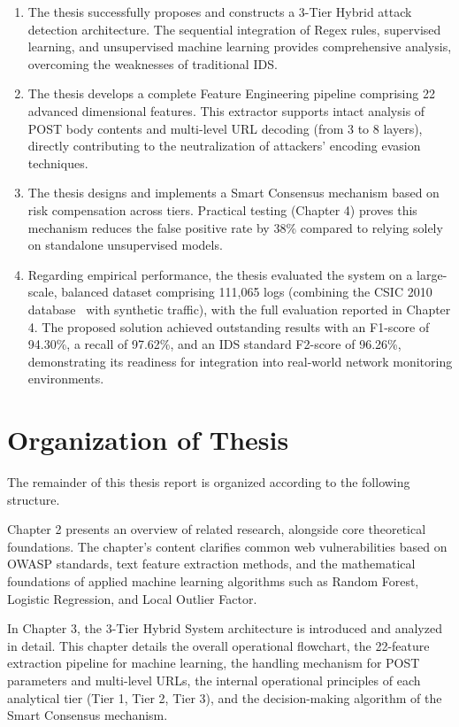 \documentclass[../main.tex]{subfiles}
\begin{document}
\begin{enumerate}
\item The thesis successfully proposes and constructs a 3-Tier Hybrid attack detection architecture. The sequential integration of Regex rules, supervised learning, and unsupervised machine learning provides comprehensive analysis, overcoming the weaknesses of traditional IDS.
\item The thesis develops a complete Feature Engineering pipeline comprising 22 advanced dimensional features. This extractor supports intact analysis of POST body contents and multi-level URL decoding (from 3 to 8 layers), directly contributing to the neutralization of attackers' encoding evasion techniques.
\item The thesis designs and implements a Smart Consensus mechanism based on risk compensation across tiers. Practical testing (Chapter 4) proves this mechanism reduces the false positive rate by 38\% compared to relying solely on standalone unsupervised models.
\item Regarding empirical performance, the thesis evaluated the system on a large-scale, balanced dataset comprising 111,065 logs (combining the CSIC 2010 database~\cite{csic2010} with synthetic traffic), with the full evaluation reported in Chapter 4. The proposed solution achieved outstanding results with an F1-score of 94.30\%, a recall of 97.62\%, and an IDS standard F2-score of 96.26\%, demonstrating its readiness for integration into real-world network monitoring environments.
\end{enumerate}

\section{Organization of Thesis}
The remainder of this thesis report is organized according to the following structure.

Chapter 2 presents an overview of related research, alongside core theoretical foundations. The chapter's content clarifies common web vulnerabilities based on OWASP standards, text feature extraction methods, and the mathematical foundations of applied machine learning algorithms such as Random Forest, Logistic Regression, and Local Outlier Factor.

In Chapter 3, the 3-Tier Hybrid System architecture is introduced and analyzed in detail. This chapter details the overall operational flowchart, the 22-feature extraction pipeline for machine learning, the handling mechanism for POST parameters and multi-level URLs, the internal operational principles of each analytical tier (Tier 1, Tier 2, Tier 3), and the decision-making algorithm of the Smart Consensus mechanism.
\end{document}
